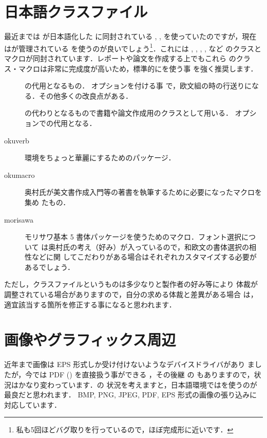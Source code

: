 \section{日本語クラスファイル}

最近までは  が日本語化した \pTeX に同封されている
, ,  を使っていたのですが，現在はが管理されている  を使うのが良いでしょう\footnote{
私も5回ほどバグ取りを行っているので，ほぼ完成形に近いです．}．これには
, , , ,  など
のクラスとマクロが同封されています．レポートや論文を作成する上でもこれら
のクラス・マクロは非常に完成度が高いため，標準的にを使う事
を強く推奨します．%
\begin{description}
 \item[] 
   の代用となるもの． オプションを付ける事
  で，欧文組の時の行送りになる．その他多くの改良点がある．
 \item[]
   の代わりとなるもので書籍や論文作成用のクラスとして用いる．
   オプションでの代用となる．
 \item[okuverb]
   環境をちょっと華麗にするためのパッケージ．
\item[okumacro]
  奥村氏が美文書作成入門等の著書を執筆するために必要になったマクロを集め
  たもの．
\item[morisawa]
  モリサワ基本 5 書体パッケージを使うためのマクロ．フォント選択について
  は奥村氏の考え（好み）が入っているので，和欧文の書体選択の相性などに関
  してこだわりがある場合はそれぞれカスタマイズする必要があるでしょう．
\end{description}
ただし，クラスファイルというものは多少なりと製作者の好み等により
体裁が調整されている場合がありますので，自分の求める体裁と差異がある場合
は，適宜該当する箇所を修正する事になると思われます．


\section{画像やグラフィックス周辺}

%
近年まで画像は EPS 形式しか受け付けないようなデバイスドライバがあり
ましたが，今では PDF () を直接扱う事ができる \Dvipdfm，その後継
の \Dvipdfmx もありますので，状況はかなり変わっています．\genzai の
状況を考えますと，日本語環境では\Dvipdfmx を使うのが最良だと思われます．
BMP, PNG, JPEG, PDF, EPS 形式の画像の張り込みに対応しています．

